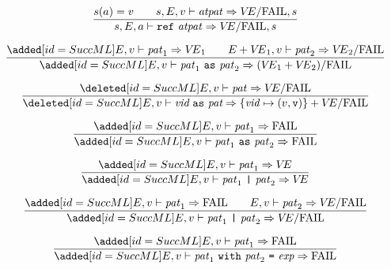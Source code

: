 \replacement{\theidstatus}{\begin{equation}
\label{exconpat-dyn-rule2}
\frac{\E(\longexn)=\e\qquad\V\notin\{\e\}\times\Val}
     {\E,\V\ts\exconpat\ra\FAIL}
\end{equation}}{\begin{equation}
\label{exconpat-dyn-rule2}
\frac{\E(\longvid)=(\e,\ise)\qquad\V\notin\{\e\}\times\Val}
     {\E,\V\ts\vidpat\ra\FAIL}
\end{equation}}
\oldpagebreak
\begin{equation}	%
\frac{\s(\A)=\V\qquad\s,\E,\V\ts\atpat\ra\VE/\fail,\s}
     {\s,\E,\A\ts\REF\ \atpat\ra \VE/\fail,\s}\index{57.0}
\end{equation}


\begin{equation}	%
\frac{\ADD{\E,\V\ts\pat_1\ra\VE_1 \qquad \plusmap{\E}{\VE_1},\V\ts\pat_2\ra\VE_2/\fail}}
     {\ADD{\E,\V\ts\aspat\ra(\VE_1+\VE_2)/\fail}}
\end{equation}

\SameEqn
\begin{equation}	%
\frac{\CUT{\E,\V\ts\pat\ra\VE/\fail}}
     {\CUT{\E,\V\ts\layeredvidpata\ra\{\vid\mapsto(\V,\isv)\}+\VE/\fail}}
\end{equation}
\NextEqn

\BeginNewEqns
\begin{equation}	%
\frac{\ADD{\E,\V\ts\pat_1\ra\fail}}
     {\ADD{\E,\V\ts\aspat\ra\fail}}
\end{equation}

\begin{equation}	%
\frac{\ADD{\E,\V\ts\pat_1\ra\VE}}
     {\ADD{\E,\V\ts\orpat\ra\VE}}
\end{equation}

\begin{equation}	%
\frac{\ADD{\E,\V\ts\pat_1\ra\fail \qquad \E,\V\ts\pat_2\ra\VE/\fail}}
     {\ADD{\E,\V\ts\orpat\ra\VE/\fail}}
\end{equation}

\begin{equation}	%
\frac{\ADD{\E,\V\ts\pat_1\ra\fail}}
     {\ADD{\E,\V\ts\nestedpat\ra\fail}}
\end{equation}

